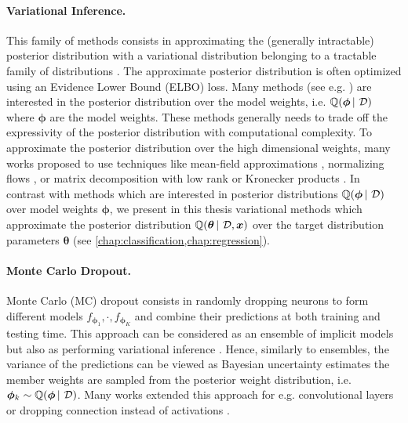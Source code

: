 \paragraph*{Variational Inference.} This family of methods consists in approximating the (generally intractable) posterior distribution with a variational distribution belonging to a tractable family of distributions \cite{blei2017vi}. The approximate posterior distribution is often optimized using an Evidence Lower Bound (ELBO) loss. Many methods (see e.g. \cite{practical-bnn,bayesian-networks,practical_deep_bayesian_principles}) are interested in the posterior distribution over the model weights, i.e. $\operatorname{\mathbb{Q}}(\bm{\phi} \,|\, \operatorname{\mathcal{D}})$ where $\bm{\phi}$ are the model weights. These methods generally needs to trade off the expressivity of the posterior distribution with computational complexity. To approximate the posterior distribution over the high dimensional weights, many works proposed to use techniques like mean-field approximations \citep{practical-bnn,bayesian-networks,practical_deep_bayesian_principles}, normalizing flows \cite{radialflow,Louizos2017}, or matrix decomposition with low rank or Kronecker products \cite{mishkin2018slang,bae2018eigen,zhang2017noisy}. In contrast with methods which are interested in posterior distributions $\operatorname{\mathbb{Q}}(\bm{\phi} \,|\, \operatorname{\mathcal{D}})$ over model weights $\bm{\phi}$, we present in this thesis variational methods which approximate the posterior distribution $\operatorname{\mathbb{Q}}(\bm{\theta} \,|\, \operatorname{\mathcal{D}}, \bm{x})$ over the target distribution parameters $\bm{\theta}$ (see \cref{chap:classification,chap:regression}).

\paragraph*{Monte Carlo Dropout.} Monte Carlo (MC) dropout consists in randomly dropping neurons to form different models $f_{\bm{\phi}_1},\cdot, f_{\bm{\phi}_K}$ and combine their predictions \citep{dropout} at both training and testing time. This approach can be considered as an ensemble of implicit models \citep{abe2022deep} but also as performing variational inference \citep{dropout}. Hence, similarly to ensembles, the variance of the predictions can be viewed as Bayesian uncertainty estimates the member weights are sampled from the posterior weight distribution, i.e. $\bm{\phi}_k \sim \operatorname{\mathbb{Q}}(\bm{\phi} \,|\, \operatorname{\mathcal{D}})$. Many works extended this approach for e.g. convolutional layers \citep{tassi2020bayesian} or dropping connection instead of activations \citep{wan2013dropconnect}.

